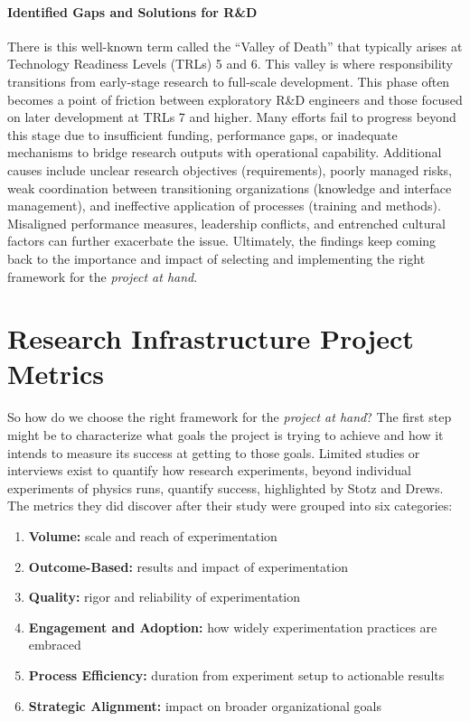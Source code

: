 \paragraph{Identified Gaps and Solutions for R\&D}
There is this well-known term called the “Valley of Death” that typically arises at Technology Readiness Levels (TRLs) 5 and 6.
This valley is where responsibility transitions from early-stage research to full-scale development. 
This phase often becomes a point of friction between exploratory R\&D engineers and those focused on later development at TRLs 7 and higher\cite{r&dSE}. 
Many efforts fail to progress beyond this stage due to insufficient funding, performance gaps, or inadequate mechanisms to bridge research outputs with operational capability. 
Additional causes include unclear research objectives (requirements), poorly managed risks, weak coordination between transitioning organizations (knowledge and interface management), and ineffective application of processes (training and methods)\cite{r&dSE}. 
Misaligned performance measures, leadership conflicts, and entrenched cultural factors can further exacerbate the issue. 
Ultimately, the findings keep coming back to the importance and impact of selecting and implementing the right framework for the \textit{project at hand}.
\section{Research Infrastructure Project Metrics}
\label{sect:metrics}
So how do we choose the right framework for the \textit{project at hand}?
The first step might be to characterize what goals the project is trying to achieve and how it intends to measure its success at getting to those goals.
Limited studies or interviews exist to quantify how research experiments, beyond individual experiments of physics runs, quantify success, highlighted by Stotz and Drews\cite{experimentMetrics}. 
The metrics they did discover after their study were grouped into six categories: 
\begin{enumerate}[noitemsep, topsep=0pt]
    \item \textbf{Volume:} scale and reach of experimentation
    \item \textbf{Outcome-Based:} results and impact of experimentation
    \item \textbf{Quality:} rigor and reliability of experimentation
    \item \textbf{Engagement and Adoption:} how widely experimentation practices are embraced
    \item \textbf{Process Efficiency:} duration from experiment setup to actionable results
    \item \textbf{Strategic Alignment:} impact on broader organizational goals
\end{enumerate}

